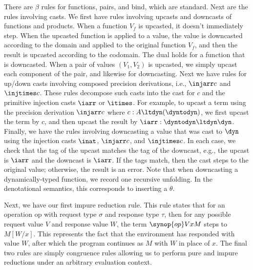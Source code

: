 \documentclass[acmsmall, screen]{acmart}
\theoremstyle{remark}
\begin{document}
There are $\beta$ rules for functions, pairs, and bind, which are standard. Next
are the rules involving casts. We first have rules involving upcasts and
downcasts of functions and products.
%
When a function $V_f$ is upcasted, it doesn't immediately step. When the
upcasted function is applied to a value, the value is downcasted according to
the domain and applied to the original function $V_f$, and then the result is
upcasted according to the codomain. The dual holds for a function that is
downcasted.
%
When a pair of values $(V_1, V_2)$ is upcasted, we simply upcast each component
of the pair, and likewise for downcasting.
%
Next we have rules for up/down casts involving composed precision derivations,
i.e., $\injarr c$ and $\injtimes c$. These rules decompose such casts into the
cast for $c$ and the primitive injection casts $\iarr$ or $\itimes$. 
For example, to upcast a term using the precision derivation $\injarr c$ where
$c : A \ltdyn (\dyntodyn)$, we first upcast the term by $c$, and then upcast the
result by $\iarr : \dyntodyn \ltdyn \dyn$.
%
Finally, we have the rules involving downcasting a value that was cast to $\dyn$
using the injection casts $\inat$, $\injarr c$, and $\injtimes c$. In each case,
we check that the tag of the upcast matches the tag of the downcast, e.g., the
upcast is $\iarr$ and the downcast is $\iarr$. If the tags match, then the cast
steps to the original value; otherwise, the result is an error. Note that when
downcasting a dynamically-typed function, we record one recursive unfolding. In
the denotational semantics, this corresponds to inserting a $\theta$.
%

Next, we have our first impure reduction rule. This rule states that for an
operation $\text{op}$ with request type $\sigma$ and response type $\tau$, then
for any possible request value $V$ and response value $W$, the term $\synop{op}
V x M$ steps to $M[W/x]$. This represents the fact that the environment has
responded with value $W$, after which the program continues as $M$ with $W$ in
place of $x$.
%
The final two rules are simply congruence rules allowing us to perform pure and
impure reductions under an arbitrary evaluation context.
\end{document}
